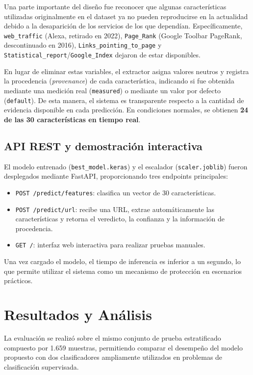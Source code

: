 \documentclass[conference]{IEEEtran}
\begin{document}
Una parte importante del diseño fue reconocer que algunas características utilizadas originalmente en el dataset ya no pueden reproducirse en la actualidad debido a la desaparición de los servicios de los que dependían. Específicamente, \texttt{web\_traffic} (Alexa, retirado en 2022), \texttt{Page\_Rank} (Google Toolbar PageRank, descontinuado en 2016), \texttt{Links\_pointing\_to\_page} y \texttt{Statistical\_report}/\texttt{Google\_Index} dejaron de estar disponibles.

En lugar de eliminar estas variables, el extractor asigna valores neutros y registra la procedencia (\textit{provenance}) de cada característica, indicando si fue obtenida mediante una medición real (\texttt{measured}) o mediante un valor por defecto (\texttt{default}). De esta manera, el sistema es transparente respecto a la cantidad de evidencia disponible en cada predicción. En condiciones normales, se obtienen \textbf{24 de las 30 características en tiempo real}.

\subsection{API REST y demostración interactiva}

El modelo entrenado (\texttt{best\_model.keras}) y el escalador (\texttt{scaler.joblib}) fueron desplegados mediante FastAPI, proporcionando tres endpoints principales:

\begin{itemize}
\item \texttt{POST /predict/features}: clasifica un vector de 30 características.
\item \texttt{POST /predict/url}: recibe una URL, extrae automáticamente las características y retorna el veredicto, la confianza y la información de procedencia.
\item \texttt{GET /}: interfaz web interactiva para realizar pruebas manuales.
\end{itemize}

Una vez cargado el modelo, el tiempo de inferencia es inferior a un segundo, lo que permite utilizar el sistema como un mecanismo de protección en escenarios prácticos.

\section{Resultados y Análisis}
La evaluación se realizó sobre el mismo conjunto de prueba estratificado compuesto por 1.659 muestras, permitiendo comparar el desempeño del modelo propuesto con dos clasificadores ampliamente utilizados en problemas de clasificación supervisada.
\end{document}
